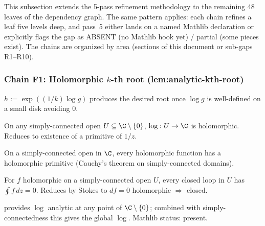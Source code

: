 This subsection extends the 5-pass refinement methodology to the
remaining 48 leaves of the dependency graph.  The same pattern
applies: each chain refines a leaf five levels deep, and pass~5
either lands on a named Mathlib declaration or explicitly flags
the gap as ABSENT (no Mathlib hook yet) / partial (some pieces
exist).  The chains are organized by area (sections of this
document or sub-gaps R1--R10).

\subsubsection*{Chain F1: Holomorphic $k$-th root (lem:analytic-kth-root)}

\begin{lemma}
\label{lem:akr-r1}
$h := \exp((1/k)\log g)$ produces the desired root once $\log g$ is well-defined on a small disk avoiding $0$.
\leanok
\end{lemma}

\begin{lemma}
\label{lem:akr-r2}
On any simply-connected open $U \subseteq \C \setminus \{0\}$, $\log : U \to \C$ is holomorphic.  Reduces to existence of a primitive of $1/z$.
\leanok\mathlibok
\end{lemma}

\begin{lemma}
\label{lem:akr-r3}
On a simply-connected open in $\C$, every holomorphic function has a holomorphic primitive (Cauchy's theorem on simply-connected domains).
\leanok\mathlibok
\end{lemma}

\begin{lemma}
\label{lem:akr-r4}
For $f$ holomorphic on a simply-connected open $U$, every closed loop in $U$ has $\oint f\,dz = 0$.  Reduces by Stokes to $df = 0$ holomorphic $\Rightarrow$ closed.
\leanok\mathlibok
\end{lemma}

\begin{lemma}
\label{lem:akr-r5}
 provides $\log$ analytic at any point of $\C \setminus \{0\}$; combined with simply-connectedness this gives the global $\log$.  Mathlib status: present.
\leanok\mathlibok
\end{lemma}

